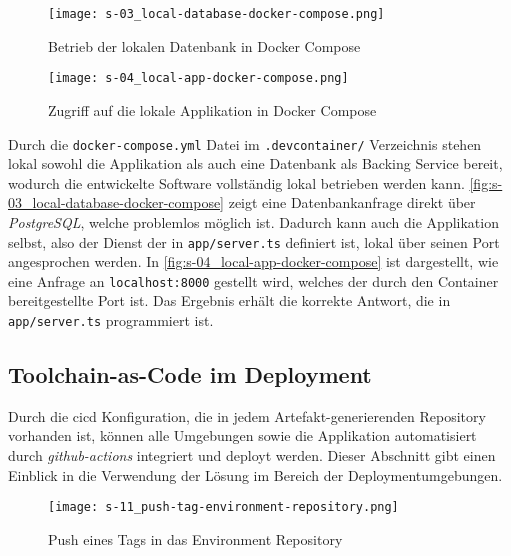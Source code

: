 \clearpage

\begin{figure}[H]
    \centering
    \texttt{[image: s-03\_local-database-docker-compose.png]}
    \caption{Betrieb der lokalen Datenbank in Docker Compose}
    \label{fig:s-03_local-database-docker-compose}
\end{figure}

\begin{figure}[H]
    \centering
    \texttt{[image: s-04\_local-app-docker-compose.png]}
    \caption{Zugriff auf die lokale Applikation in Docker Compose}
    \label{fig:s-04_local-app-docker-compose}
\end{figure}

Durch die \texttt{docker-compose.yml} Datei im \texttt{.devcontainer/} Verzeichnis stehen lokal sowohl die Applikation als auch eine Datenbank als Backing Service bereit, wodurch die entwickelte Software vollständig lokal betrieben werden kann. \autoref{fig:s-03_local-database-docker-compose} zeigt eine Datenbankanfrage direkt über \textit{PostgreSQL}, welche problemlos möglich ist. Dadurch kann auch die Applikation selbst, also der Dienst der in \texttt{app/server.ts} definiert ist, lokal über seinen Port angesprochen werden. In \autoref{fig:s-04_local-app-docker-compose} ist dargestellt, wie eine Anfrage an \texttt{localhost:8000} gestellt wird, welches der durch den Container bereitgestellte Port ist. Das Ergebnis erhält die korrekte Antwort, die in \texttt{app/server.ts} programmiert ist.

\subsection{Toolchain-as-Code im Deployment}
\label{subsec:06-03-02_toolchain-as-code-in-deployment}

Durch die \Gls{cicd} Konfiguration, die in jedem Artefakt-generierenden Repository vorhanden ist, können alle Umgebungen sowie die Applikation automatisiert durch \textit{\Gls{github-actions}} integriert und deployt werden. Dieser Abschnitt gibt einen Einblick in die Verwendung der  Lösung im Bereich der Deploymentumgebungen.

\begin{wrapfigure}{l}{0.4\textwidth}
    \vspace{-10pt}
    \centering
    \texttt{[image: s-11\_push-tag-environment-repository.png]}
    \caption{Push eines Tags in das Environment Repository}
    \label{fig:s-11_push-tag-environment-repository}
    \vspace{-05pt}
\end{wrapfigure}

